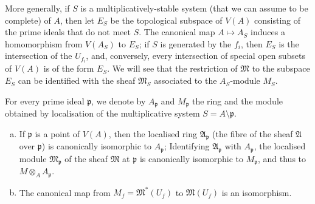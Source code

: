 \documentclass{article}
\theoremstyle{plain}
\newenvironment{theorem}[1]
    {\renewcommand\theinnercustomtheorem{#1}\innercustomtheorem}
    {\endinnercustomtheorem}
\theoremstyle{definition}
\newcommand{\oldpage}[1]{\marginpar{\footnotesize$\Big\vert$ \textit{p.~#1}}}
\begin{document}
More generally, if $S$ is a multiplicatively-stable system (that we can assume to be complete) of $A$, then let $E_S$ be the topological subspace of $V(A)$ consisting of the prime ideals that do not meet $S$.
The canonical map $A\mapsto A_S$ induces a homomorphism from $V(A_S)$ to $E_S$;
if $S$ is generated by the $f_i$,
\oldpage{1-05}
then $E_S$ is the intersection of the $U_{f_i}$, and, conversely, every intersection of special open subsets of $V(A)$ is of the form $E_S$.
We will see that the restriction of $\mathfrak{M}$ to the subspace $E_S$ can be identified with the sheaf $\mathfrak{M}_S$ associated to the $A_S$-module $M_S$.

For every prime ideal $\mathfrak{p}$, we denote by $A_\mathfrak{p}$ and $M_\mathfrak{p}$ the ring and the module obtained by localisation of the multiplicative system $S=A\setminus\mathfrak{p}$.

\begin{theorem}{1}
\label{theroem1}
  \begin{enumerate}[(a)]
    \item If $\mathfrak{p}$ is a point of $V(A)$, then the localised ring $\mathfrak{A}_\mathfrak{p}$ (the fibre of the sheaf $\mathfrak{A}$ over $\mathfrak{p}$) is canonically isomorphic to $A_\mathfrak{p}$;
      Identifying $\mathfrak{A}_\mathfrak{p}$ with $A_\mathfrak{p}$, the localised module $\mathfrak{M}_\mathfrak{p}$ of the sheaf $\mathfrak{M}$ at $\mathfrak{p}$ is canonically isomorphic to $M_\mathfrak{p}$, and thus to $M\otimes_A A_\mathfrak{p}$.
    \item The canonical map from $M_f=\mathfrak{M}^*(U_f)$ to $\mathfrak{M}(U_f)$ is an isomorphism.
  \end{enumerate}
\end{theorem}
\end{document}
